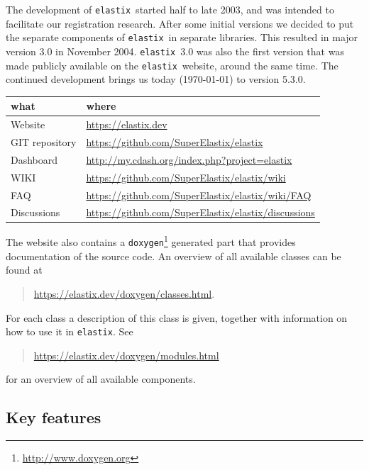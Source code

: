\documentclass[]{report}
\newcommand{\elastix}{\texttt{elastix}}
\begin{document}
The development of \elastix\ started half to late 2003, and was
intended to facilitate our registration research. After some initial
versions we decided to put the separate components of \elastix\ in
separate libraries. This resulted in major version 3.0 in November
2004. \elastix\ 3.0 was also the first version that was made
publicly available on the \elastix\ website, around the same time.
The continued development brings us today (\today) to version 5.3.0.

\begin{table}[h!]
\begin{tabular}{l|l}
what & where \\
\hline
Website        & \url{https://elastix.dev} \\
GIT repository & \url{https://github.com/SuperElastix/elastix} \\
Dashboard      & \url{http://my.cdash.org/index.php?project=elastix} \\
WIKI           & \url{https://github.com/SuperElastix/elastix/wiki} \\
FAQ            & \url{https://github.com/SuperElastix/elastix/wiki/FAQ} \\
Discussions    & \url{https://github.com/SuperElastix/elastix/discussions}
\end{tabular}
\end{table}

The website also contains a
\texttt{doxygen}\footnote{\url{http://www.doxygen.org}} generated part that
provides documentation of the source code. An overview of all available classes
can be found at
\begin{quote}
\url{https://elastix.dev/doxygen/classes.html}.
\end{quote}
For each class a description of this class is given, together with
information on how to use it in \elastix. See
\begin{quote}
\url{https://elastix.dev/doxygen/modules.html}
\end{quote}
for an overview of all available components.

\subsection{Key features}\label{sec:elastix:key}
\end{document}
